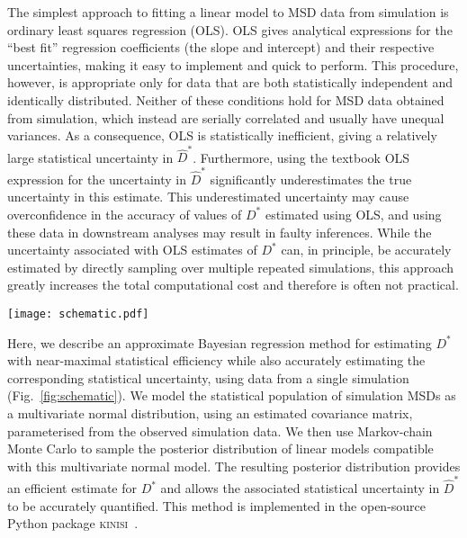 \documentclass[reprint,superscriptaddress,nobibnotes,amsmath,amssymb,aps,prx,hidelinks,linenumbers]{revtex4-2}
\newcommand{\Dest}{\ensuremath{\widehat{D}^*}}
\newcommand{\D}{\ensuremath{D^*}}
\begin{document}
The simplest approach to fitting a linear model to MSD data from simulation is ordinary least squares regression (OLS).
OLS gives analytical expressions for the ``best fit'' regression coefficients (the slope and intercept) and their respective uncertainties, making it easy to implement and quick to perform.
This procedure, however, is appropriate only for data that are both statistically independent and identically distributed.
Neither of these conditions hold for MSD data obtained from simulation, which instead are serially correlated and usually have unequal variances.
As a consequence, OLS is statistically inefficient, giving a relatively large statistical uncertainty in $\Dest$.
Furthermore, using the textbook OLS expression for the uncertainty in $\Dest$ significantly underestimates the true uncertainty in this estimate.
This underestimated uncertainty may cause overconfidence in the accuracy of values of $\D$ estimated using OLS, and using these data in downstream analyses may result in faulty inferences.
While the uncertainty associated with OLS estimates of $\D$ can, in principle, be accurately estimated by directly sampling over multiple repeated simulations, this approach greatly increases the total computational cost and therefore is often not practical.

\begin{figure*}
    \centering
    \texttt{[image: schematic.pdf]}
    \caption{
        A schematic diagram of the Bayesian regression method described in this work, running from our simulations through the sampling of displacement, variance and covariance estimation and final the sampling process to give the marginal posterior distribution for $\D$.}
    \label{fig:schematic}
\end{figure*}

Here, we describe an approximate Bayesian regression method for estimating $\D$ with near-maximal statistical efficiency while also accurately estimating the corresponding statistical uncertainty, using data from a single simulation (Fig.~\ref{fig:schematic}).
We model the statistical population of simulation MSDs as a multivariate normal distribution, using an estimated covariance matrix, parameterised from the observed simulation data.
We then use Markov-chain Monte Carlo to sample the posterior distribution of linear models compatible with this multivariate normal model.
The resulting posterior distribution provides an efficient estimate for $\D$ and allows the associated statistical uncertainty in $\Dest$ to be accurately quantified.
This method is implemented in the open-source Python package \textsc{kinisi}~\cite{mccluskey_kinisi_2022}.
\end{document}
